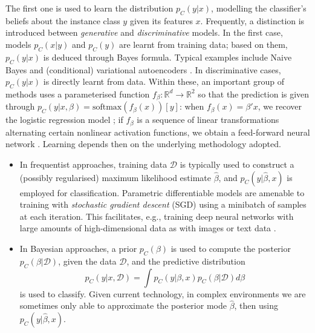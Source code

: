 The first one is used to learn the distribution $p_C(y|x)$, modelling the classifier's beliefs about the  instance class $y$ given its features $x$. 
Frequently, a distinction is introduced 
between {\em generative} and {\em discriminative} models. %
   In the first case, models $p_C(x|y)$ and $p_C (y)$ are learnt from training data; based on them,
$p_C(y|x)$ is deduced through Bayes formula. Typical examples include 
Naive Bayes \cite{rish2001empirical} and (conditional) variational autoencoders %
 \cite{kingma2014semi}.
%
In discriminative cases, $p_C(y|x)$ is directly learnt from data.
Within these, an important group of methods uses  
a parameterised function
$f_\beta : \mathbb{R}^d \rightarrow \mathbb{R}^2 $
so that the prediction is given through 
$p_C(y|x,\beta) = \mbox{softmax} (f_\beta (x))[y]$: when $f_\beta (x) = \beta' x$, we recover the logistic regression
model 
\cite{mccullagh1989generalized}; 
if $f_\beta$ is  a sequence of linear transformations alternating certain nonlinear activation functions,   %
 we obtain a feed-forward neural network \cite{bishop2006pattern}. 
 Learning depends then on the underlying
methodology adopted.
%
\begin{itemize}
\item In frequentist approaches, training data $\mathcal{D}$ is 
typically used to construct a (possibly regularised) maximum likelihood estimate $\hat{\beta}$, and $p_C(y | \hat{ \beta }, x )$ is employed for classification. Parametric
differentiable models are amenable to training with \emph{stochastic gradient descent}
(SGD) \cite{bottou2008tradeoffs}  %
using a minibatch %
of samples at each iteration. 
This facilitates, e.g.,  training 
deep neural networks with large amounts of
high-dimensional data as 
with images or text data \cite{10.5555/3086952}.
\item In Bayesian approaches, a prior $p_C (\beta)$ is used to compute the posterior $p_C (\beta | \mathcal{D} )$, given the data $\mathcal{D}$, and the predictive distribution
\begin{equation}\label{MIERDA}
p_C (y | x, \mathcal{D})= \int p_C(y | \beta , x ) p_C (\beta | \mathcal{D} ) d\beta 
\end{equation} 
is used to classify. Given current technology,
in complex environments  
we are sometimes only able to approximate the posterior mode $\hat {\beta}$,
then using $p_C(y | \hat {\beta} , x )$.
\end{itemize}

